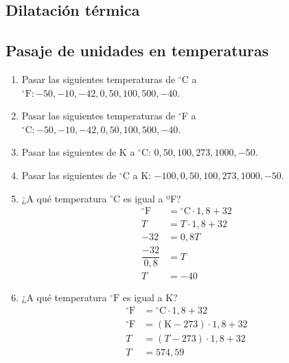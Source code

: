 \subsection*{Dilatación térmica}



\subsection*{Pasaje de unidades en temperaturas}

\begin{enumerate}
\item Pasar las siguientes temperaturas de $^\circ$C a $^\circ\text{F}: -50, -10, -42, 0, 50, 100, 500, -40$.

\item Pasar las siguientes temperaturas de $^\circ$F a $^\circ\text{C}: -50, -10, -42, 0, 50, 100, 500, -40$.

\item Pasar las siguientes de K a $^\circ$C: $0, 50, 100, 273, 1000, -50$.

\item Pasar las siguientes de $^\circ$C a K: $-100, 0, 50, 100, 273, 1000, -50$.

\item ¿A qué temperatura $\text{$^\circ$C}$ es igual a ºF?
\begin{align*}
    ^\circ\text{F}&= \text{$^\circ$C} \cdot 1,8 + 32\\
    T &= T \cdot 1,8 + 32\\
    -32 &= 0,8 T\\
    \dfrac{-32}{0,8} &= T\\
    T &= -40
\end{align*}

\item ¿A qué temperatura $\text{$^\circ$F}$ es igual a K?
\begin{align*}
    ^\circ\text{F}&= \text{$^\circ$C} \cdot 1,8 + 32\\
    ^\circ\text{F}&= (\text{K}-273) \cdot 1,8 + 32\\
    T&= (T-273) \cdot 1,8 + 32\\
    T &= 574,59
\end{align*}
\end{enumerate}
